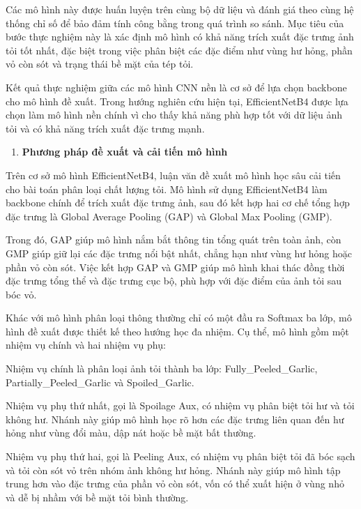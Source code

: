 \documentclass[
]{article}
\begin{document}
Các mô hình này được huấn luyện trên cùng bộ dữ liệu và đánh giá theo
cùng hệ thống chỉ số để bảo đảm tính công bằng trong quá trình so sánh.
Mục tiêu của bước thực nghiệm này là xác định mô hình có khả năng trích
xuất đặc trưng ảnh tỏi tốt nhất, đặc biệt trong việc phân biệt các đặc
điểm như vùng hư hỏng, phần vỏ còn sót và trạng thái bề mặt của tép tỏi.

Kết quả thực nghiệm giữa các mô hình CNN nền là cơ sở để lựa chọn
backbone cho mô hình đề xuất. Trong hướng nghiên cứu hiện tại,
EfficientNetB4 được lựa chọn làm mô hình nền chính vì cho thấy khả năng
phù hợp tốt với dữ liệu ảnh tỏi và có khả năng trích xuất đặc trưng
mạnh.

\begin{enumerate}
\def\labelenumi{\alph{enumi}.}
\setcounter{enumi}{3}
\item
  \textbf{Phương pháp đề xuất và cải tiến mô hình}
\end{enumerate}

Trên cơ sở mô hình EfficientNetB4, luận văn đề xuất mô hình học sâu cải
tiến cho bài toán phân loại chất lượng tỏi. Mô hình sử dụng
EfficientNetB4 làm backbone chính để trích xuất đặc trưng ảnh, sau đó
kết hợp hai cơ chế tổng hợp đặc trưng là Global Average Pooling (GAP) và
Global Max Pooling (GMP).

Trong đó, GAP giúp mô hình nắm bắt thông tin tổng quát trên toàn ảnh,
còn GMP giúp giữ lại các đặc trưng nổi bật nhất, chẳng hạn như vùng hư
hỏng hoặc phần vỏ còn sót. Việc kết hợp GAP và GMP giúp mô hình khai
thác đồng thời đặc trưng tổng thể và đặc trưng cục bộ, phù hợp với đặc
điểm của ảnh tỏi sau bóc vỏ.

Khác với mô hình phân loại thông thường chỉ có một đầu ra Softmax ba
lớp, mô hình đề xuất được thiết kế theo hướng học đa nhiệm. Cụ thể, mô
hình gồm một nhiệm vụ chính và hai nhiệm vụ phụ:

Nhiệm vụ chính là phân loại ảnh tỏi thành ba lớp: Fully\_Peeled\_Garlic,
Partially\_Peeled\_Garlic và Spoiled\_Garlic.

Nhiệm vụ phụ thứ nhất, gọi là Spoilage Aux, có nhiệm vụ phân biệt tỏi hư
và tỏi không hư. Nhánh này giúp mô hình học rõ hơn các đặc trưng liên
quan đến hư hỏng như vùng đổi màu, dập nát hoặc bề mặt bất thường.

Nhiệm vụ phụ thứ hai, gọi là Peeling Aux, có nhiệm vụ phân biệt tỏi đã
bóc sạch và tỏi còn sót vỏ trên nhóm ảnh không hư hỏng. Nhánh này giúp
mô hình tập trung hơn vào đặc trưng của phần vỏ còn sót, vốn có thể xuất
hiện ở vùng nhỏ và dễ bị nhầm với bề mặt tỏi bình thường.
\end{document}
